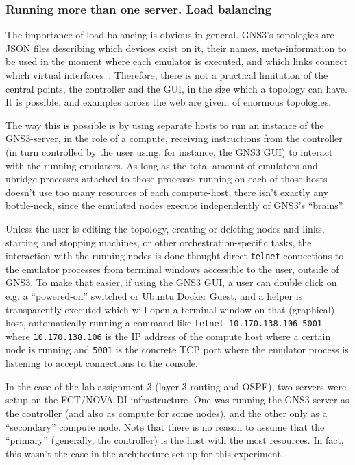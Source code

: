 \subsubsection{Running more than one server. Load balancing}

The importance of load balancing is obvious in general. GNS3's topologies are JSON files describing which devices exist on it, their names, meta-information to be used in the moment where each emulator is executed, and which links connect which virtual interfaces~\cite{thebookofgns3}.
Therefore, there is not a practical limitation of the central points, the controller and the GUI, in the size which a topology can have.
It is possible, and examples across the web are given, of enormous topologies.

The way this is possible is by using separate hosts to run an instance of the GNS3-server, in the role of a compute, receiving instructions from the controller (in turn controlled by the user using, for instance, the GNS3 GUI) to interact with the running emulators.
As long as the total amount of emulators and ubridge processes attached to those processes running on each of those hosts doesn't use too many resources of each compute-host, there isn't exactly any bottle-neck, since the emulated nodes execute independently of GNS3's ``brains''.

Unless the user is editing the topology, creating or deleting nodes and links, starting and stopping machines, or other orchestration-specific tasks, the interaction with the running nodes is done thought direct \texttt{telnet} connections to the emulator processes from terminal windows accessible to the user, outside of GNS3.
To make that easier, if using the GNS3 GUI, a user can double click on e.g. a ``powered-on'' switched or Ubuntu Docker Guest, and a helper is transparently executed which will open a terminal window on that (graphical) host, automatically running a command like \texttt{telnet 10.170.138.106 5001}---where \texttt{10.170.138.106} is the IP address of the compute host where a certain node is running and \texttt{5001} is the concrete TCP port where the emulator process is listening to accept connections to the console.

In the case of the lab assignment 3 (layer-3 routing and OSPF), two servers were setup on the FCT/NOVA DI infrastructure.
One was running the GNS3 server as the controller (and also as compute for some nodes), and the other only as a ``secondary'' compute node.
Note that there is no reason to assume that the ``primary'' (generally, the controller) is the host with the most resources.
In fact, this wasn't the case in the architecture set up for this experiment.

